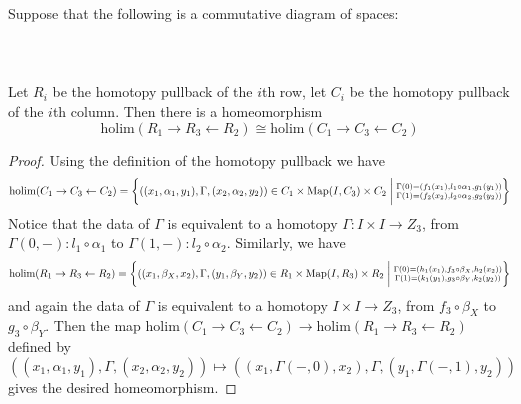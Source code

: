 \begin{prp}\label{prp:3x3} Suppose that the following is a commutative diagram of spaces:  
 \\~\\  \\~\\
Let $R_i$ be the homotopy pullback of the $i$th row, let $C_i$ be the homotopy pullback of the $i$th column. Then there is a homeomorphism $$\text{holim}(R_1\rightarrow R_3\leftarrow R_2)\cong\text{holim}(C_1\rightarrow C_3\leftarrow C_2)$$ 
\begin{proof}
Using the definition of the homotopy pullback we have $$\text{holim}(C_1\rightarrow C_3\leftarrow C_2)=\left\{((x_1,\alpha_1,y_1),\Gamma,(x_2,\alpha_2,y_2))\in C_1\times\text{Map}(I,C_3)\times C_2\;\bigg{|}\;\substack{\Gamma(0)=(f_1(x_1),l_1\circ\alpha_1,g_1(y_1))\\\Gamma(1)=(f_2(x_2),l_2\circ\alpha_2,g_2(y_2))}\right\}$$ Notice that the data of $\Gamma$ is equivalent to a homotopy $\Gamma:I\times I\to Z_3$, from $\Gamma(0,-):l_1\circ\alpha_1$ to $\Gamma(1,-):l_2\circ\alpha_2$. Similarly, we have $$\text{holim}(R_1\rightarrow R_3\leftarrow R_2)=\left\{((x_1,\beta_X,x_2),\Gamma,(y_1,\beta_Y,y_2))\in R_1\times\text{Map}(I,R_3)\times R_2\;\bigg{|}\;\substack{\Gamma(0)=(h_1(x_1),f_3\circ\beta_X,h_2(x_2))\\\Gamma(1)=(k_1(y_1),g_3\circ\beta_Y,k_2(y_2))}\right\}$$ and again the data of $\Gamma$ is equivalent to a homotopy $I\times I\to Z_3$, from $f_3\circ\beta_X$ to $g_3\circ\beta_Y$. Then the map $\text{holim}(C_1\rightarrow C_3\leftarrow C_2)\to\text{holim}(R_1\rightarrow R_3\leftarrow R_2)$ defined by $$((x_1,\alpha_1,y_1),\Gamma,(x_2,\alpha_2,y_2))\mapsto((x_1,\Gamma(-,0),x_2),\Gamma,(y_1,\Gamma(-,1),y_2))$$ gives the desired homeomorphism. 
\end{proof}
\end{prp}

